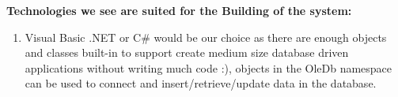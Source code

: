 \textbf{Technologies we see are suited for the Building of the system: }
\begin{enumerate}
    \item Visual Basic .NET or C# would be our choice as there are enough objects and classes built-in to support create medium size database driven applications without writing much code :), objects in the OleDb namespace can be used to connect and insert/retrieve/update data in the database.
\end{enumerate}
